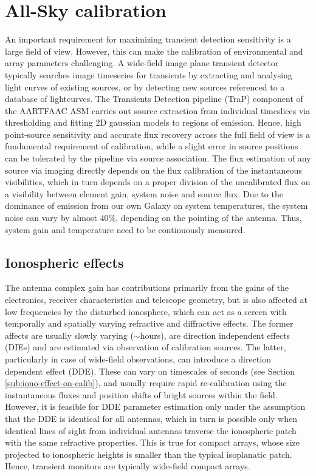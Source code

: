 \documentclass{aa}
\begin{document}
\section{\label{sec:Array-calibration-for}All-Sky calibration}
An  important requirement for  maximizing transient  detection sensitivity  is a
large field of view. However, this can make the calibration of environmental and
array  parameters  challenging.  A  wide-field  image  plane transient  detector
typically searches  image timeseries for transients by  extracting and analysing
light curves  of existing sources, or  by detecting new sources  referenced to a
database   of   lightcurves.    The   Transients   Detection   pipeline   (TraP)
\citep{swinbank2013trap}  component  of  the  AARTFAAC ASM  carries  out  source
extraction from  individual timeslices via thresholding and  fitting 2D gaussian
models to regions of emission. Hence, high point-source sensitivity and accurate
flux recovery  across the  full field  of view is  a fundamental  requirement of
calibration, while  a slight error in  source positions can be  tolerated by the
pipeline via source association.  The  flux estimation of any source via imaging
directly  depends on  the flux  calibration of  the  instantaneous visibilities,
which  in turn  depends  on a  proper division  of  the uncalibrated  flux on  a
visibility  between element  gain,  system noise  and  source flux.  Due to  the
dominance of  emission from  our own Galaxy  on system temperatures,  the system
noise can vary by almost $40\%$, depending on the pointing of the antenna. Thus,
system gain and temperature need to be continuously measured.

\subsection{\label{sub:All-Sky-cal-iono}Ionospheric effects}

The  antenna complex  gain has  contributions primarily  from the  gains  of the
electronics,  receiver  characteristics  and  telescope geometry,  but  is  also
affected at  low frequencies  by the  disturbed ionosphere, which  can act  as a
screen with temporally and spatially varying refractive and diffractive effects.
The  former affects  are  usually slowly  varying  ($\sim$hours), are  direction
independent  effects (DIEs)  and are  estimated via  observation  of calibration
sources.  The  latter, particularly  in  case  of  wide-field observations,  can
introduce a direction  dependent effect (DDE).  These can  vary on timescales of
seconds (see Section  \ref{sub:iono-effect-on-calib}), and usually require rapid
re-calibration  using the  instantaneous fluxes  and position  shifts  of bright
sources within the field.  However,  it is feasible for DDE parameter estimation
only under the  assumption that the DDE is identical for  all antennas, which in
turn is  possible only  when identical lines  of sight from  individual antennas
traverse the  ionospheric patch  with the same  refractive properties.   This is
true for compact arrays, whose  size projected to ionospheric heights is smaller
than  the typical isoplanatic  patch.  Hence,  transient monitors  are typically
wide-field compact arrays.
\end{document}
